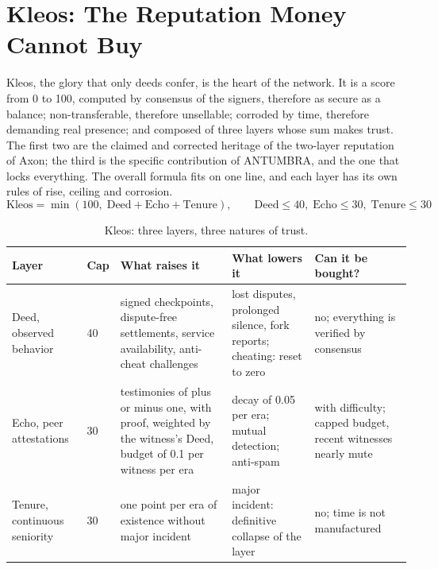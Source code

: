\section{Kleos: The Reputation Money Cannot Buy}\label{sec:kleos}

Kleos, the glory that only deeds confer, is the heart of the network. It
is a score from 0 to 100, computed by consensus of the signers, therefore
as secure as a balance; non-transferable, therefore unsellable; corroded
by time, therefore demanding real presence; and composed of three layers
whose sum makes trust. The first two are the claimed and corrected
heritage of the two-layer reputation of Axon; the third is the specific
contribution of ANTUMBRA, and the one that locks everything. The overall
formula fits on one line, and each layer has its own rules of rise,
ceiling and corrosion.
\begin{equation}\label{eq:kleos}
\mathrm{Kleos} = \min(100,\; \mathrm{Deed} + \mathrm{Echo} + \mathrm{Tenure}),
\qquad \mathrm{Deed} \le 40,\; \mathrm{Echo} \le 30,\; \mathrm{Tenure} \le 30
\end{equation}

\begin{table}[htbp]
\centering
\small
\caption{Kleos: three layers, three natures of trust.}
\label{tab:kleos}
\begin{tabularx}{\textwidth}{@{}L{3.4cm}L{1.1cm}YYL{2.6cm}@{}}
\toprule
Layer & Cap & What raises it & What lowers it & Can it be bought? \\
\midrule
Deed, observed behavior & 40 & signed checkpoints, dispute-free settlements, service availability, anti-cheat challenges & lost disputes, prolonged silence, fork reports; cheating: reset to zero & no; everything is verified by consensus \\
Echo, peer attestations & 30 & testimonies of plus or minus one, with proof, weighted by the witness's Deed, budget of 0.1 per witness per era & decay of 0.05 per era; mutual detection; anti-spam & with difficulty; capped budget, recent witnesses nearly mute \\
Tenure, continuous seniority & 30 & one point per era of existence without major incident & major incident: definitive collapse of the layer & no; time is not manufactured \\
\bottomrule
\end{tabularx}
\end{table}

